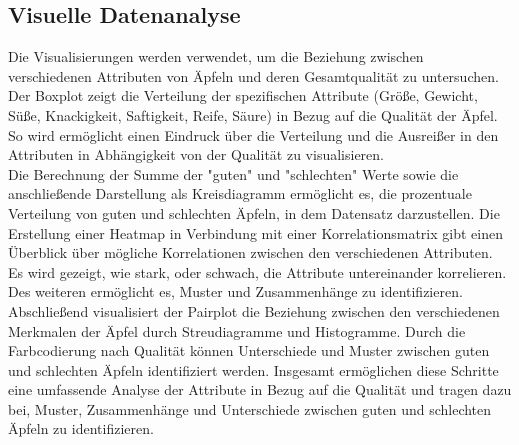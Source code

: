 \documentclass{article}
\begin{document}
\subsection{Visuelle Datenanalyse}
Die Visualisierungen werden verwendet, um die Beziehung zwischen verschiedenen Attributen von Äpfeln und deren Gesamtqualität zu untersuchen.\\ 
Der Boxplot zeigt die Verteilung der spezifischen Attribute (Größe, Gewicht, Süße, Knackigkeit, Saftigkeit, Reife, Säure) in Bezug auf die Qualität der Äpfel. So wird ermöglicht einen Eindruck über die Verteilung und die Ausreißer in den Attributen in Abhängigkeit von der Qualität zu visualisieren.\\
Die Berechnung der Summe der "guten" und "schlechten" Werte sowie die anschließende Darstellung als Kreisdiagramm ermöglicht es, die prozentuale Verteilung von guten und schlechten Äpfeln, in dem Datensatz darzustellen. Die Erstellung einer Heatmap in Verbindung mit einer Korrelationsmatrix gibt einen Überblick über mögliche Korrelationen zwischen den verschiedenen Attributen. Es wird gezeigt, wie stark, oder schwach, die Attribute untereinander korrelieren. Des weiteren ermöglicht es, Muster und Zusammenhänge zu identifizieren.\\ Abschließend visualisiert der Pairplot die Beziehung zwischen den verschiedenen Merkmalen der Äpfel durch Streudiagramme und Histogramme. Durch die Farbcodierung nach Qualität können Unterschiede und Muster zwischen guten und schlechten Äpfeln identifiziert werden. Insgesamt ermöglichen diese Schritte eine umfassende Analyse der Attribute in Bezug auf die Qualität und tragen dazu bei, Muster, Zusammenhänge und Unterschiede zwischen guten und schlechten Äpfeln zu identifizieren.\\
\end{document}
